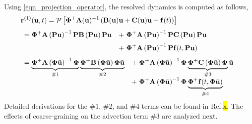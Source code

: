 Using \cref{eqn_projection_operator}, the resolved dynamics is computed as follows,
\begin{subequations}
    \begin{align}
        &\vr^{(1)}(\vu,t) = 
        \cP\left[\vPhiplus\vA(\vu)^{-1}\left(\vB(\vu)\vu + \vC(\vu)\vu + \vf(t)\right)\right]\\[4pt]
        &\begin{array}{rl}
            =\vPhiplus\vA\left(\vP\vu\right)^{-1}\vP\vB\left(\vP\vu\right)\vP\vu
            &+~\vPhiplus\vA\left(\vP\vu\right)^{-1}\vP\vC\left(\vP\vu\right)\vP\vu \\[6pt]
            &+~\vPhiplus\vA\left(\vP\vu\right)^{-1}\vP\vf(t,\vP\vu)
        \end{array}\\[4pt]
        &\begin{array}{rl}
            =\underbrace{\vPhiplus\vA\left(\vPhi\bvu\right)^{-1}\vPhi}_{\text{\#1}}
            \underbrace{\vPhiplus\vB\left(\vPhi\bvu\right)\vPhi\bvu}_{\text{\#2}}
            &+~\vPhiplus\vA\left(\vPhi\bvu\right)^{-1}\vPhi
            \underbrace{\vPhiplus\vC\left(\vPhi\bvu\right)\vPhi}_{\text{\#3}}\bvu \\[6pt]
            &+~\vPhiplus\vA\left(\vPhi\bvu\right)^{-1}\vPhi
            \underbrace{\vPhiplus\vf(t,\vPhi\bvu)}_{\text{\#4}}
        \end{array}
    \end{align}
\end{subequations}
Detailed derivations for the \#1, \#2, and \#4 terms can be found in Ref.\hl{x}. The effects of coarse-graining on the advection term \#3 are analyzed next.

